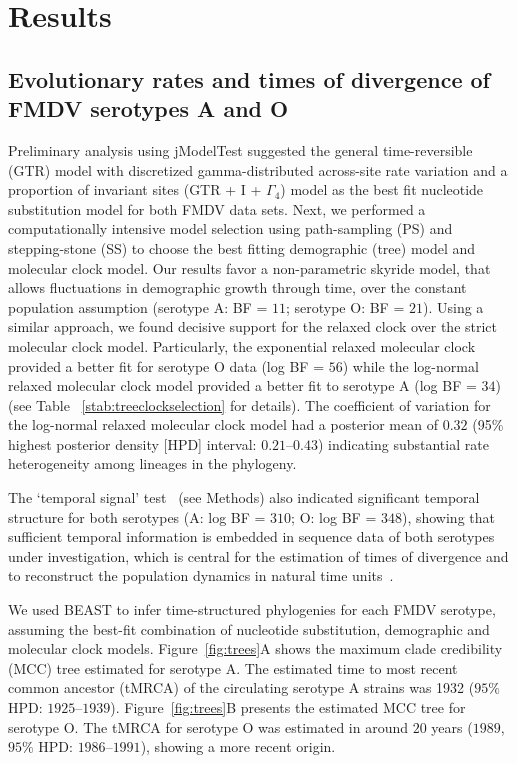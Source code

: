 \documentclass[10pt]{article}
\begin{document}
\section*{Results}

\subsection*{Evolutionary rates and times of divergence of FMDV serotypes A and O}

Preliminary analysis using jModelTest suggested the general time-reversible (GTR) model with discretized gamma-distributed across-site rate variation and a proportion of invariant sites (GTR + I + $\Gamma_{4}$) model as the best fit nucleotide substitution model for both FMDV data sets.
Next, we performed a computationally intensive model selection using path-sampling (PS) and stepping-stone (SS) to choose the best fitting demographic (tree) model and molecular clock model.
Our results favor a non-parametric skyride model, that allows fluctuations in demographic growth through time, over the constant population assumption (serotype A: BF = $11$; serotype O: BF = $21$).
Using a similar approach, we  found decisive support for the relaxed clock over the strict molecular clock model.
Particularly, the exponential relaxed molecular clock provided a better fit for serotype O data (log BF = $56$) while the log-normal relaxed molecular clock model provided a better fit to serotype A (log BF = $34$) (see Table ~\ref{stab:treeclockselection} for details). 
The coefficient of variation for the log-normal relaxed molecular clock model had a posterior mean of $0.32$ (95\% highest posterior density [HPD] interval: $0.21$--$0.43$) indicating substantial rate heterogeneity among lineages in the phylogeny.

The `temporal signal' test~\cite{Faria2012} (see Methods) also indicated significant temporal structure for both serotypes (A: log BF = $310$; O: log BF = $348$), showing that sufficient temporal information is embedded in sequence data of both serotypes under investigation, which is central for the estimation of times of divergence and to reconstruct the population dynamics in natural time units~\cite{MEP}.

We used BEAST to infer time-structured phylogenies for each FMDV serotype, assuming the best-fit combination of nucleotide substitution, demographic and molecular clock models.
Figure~\ref{fig:trees}A shows the maximum clade credibility (MCC) tree estimated for serotype A.
The estimated time to most recent common ancestor (tMRCA) of the circulating serotype A strains was 1932 ($95\%$ HPD: $1925$--$1939$).
Figure~\ref{fig:trees}B presents the estimated MCC tree for serotype O.
The tMRCA for serotype O was estimated in around $20$ years ($1989$, $95\%$ HPD: $ 1986$--$1991$), showing a more recent origin. 
\end{document}
